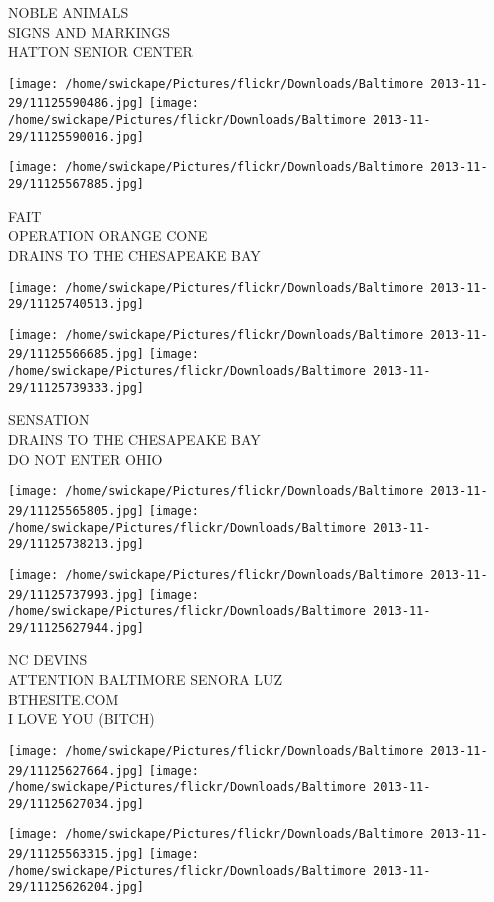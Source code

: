 \documentclass[10pt,letterpaper]{article}
\begin{document}
NOBLE ANIMALS\\
SIGNS AND MARKINGS\\
HATTON SENIOR CENTER
\pagebreak

\texttt{[image: /home/swickape/Pictures/flickr/Downloads/Baltimore 2013-11-29/11125590486.jpg]}
\texttt{[image: /home/swickape/Pictures/flickr/Downloads/Baltimore 2013-11-29/11125590016.jpg]}

\texttt{[image: /home/swickape/Pictures/flickr/Downloads/Baltimore 2013-11-29/11125567885.jpg]}

FAIT\\
OPERATION ORANGE CONE\\
DRAINS TO THE CHESAPEAKE BAY
\pagebreak

\texttt{[image: /home/swickape/Pictures/flickr/Downloads/Baltimore 2013-11-29/11125740513.jpg]}

\vspace{0.25in}
\texttt{[image: /home/swickape/Pictures/flickr/Downloads/Baltimore 2013-11-29/11125566685.jpg]}
\texttt{[image: /home/swickape/Pictures/flickr/Downloads/Baltimore 2013-11-29/11125739333.jpg]}

SENSATION\\
DRAINS TO THE CHESAPEAKE BAY\\
DO NOT ENTER OHIO
\pagebreak

\texttt{[image: /home/swickape/Pictures/flickr/Downloads/Baltimore 2013-11-29/11125565805.jpg]}
\texttt{[image: /home/swickape/Pictures/flickr/Downloads/Baltimore 2013-11-29/11125738213.jpg]}

\texttt{[image: /home/swickape/Pictures/flickr/Downloads/Baltimore 2013-11-29/11125737993.jpg]}
\texttt{[image: /home/swickape/Pictures/flickr/Downloads/Baltimore 2013-11-29/11125627944.jpg]}

NC DEVINS\\
ATTENTION BALTIMORE SENORA LUZ\\
BTHESITE.COM\\
I LOVE YOU (BITCH)
\pagebreak

\texttt{[image: /home/swickape/Pictures/flickr/Downloads/Baltimore 2013-11-29/11125627664.jpg]}
\texttt{[image: /home/swickape/Pictures/flickr/Downloads/Baltimore 2013-11-29/11125627034.jpg]}

\texttt{[image: /home/swickape/Pictures/flickr/Downloads/Baltimore 2013-11-29/11125563315.jpg]}
\texttt{[image: /home/swickape/Pictures/flickr/Downloads/Baltimore 2013-11-29/11125626204.jpg]}
\end{document}
